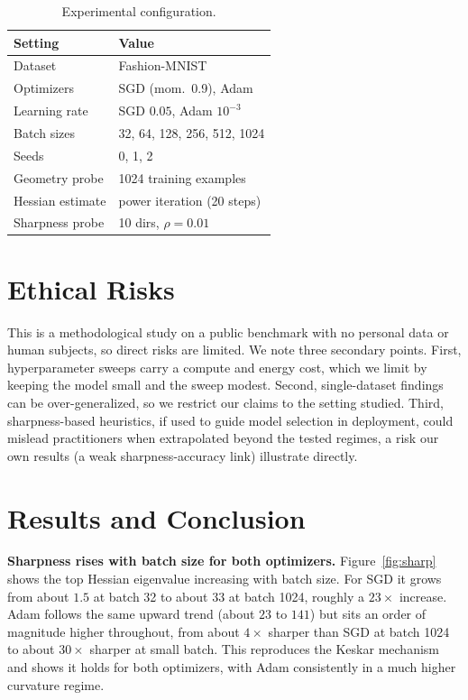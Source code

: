 \documentclass[a4paper,10pt,twoside]{article}
\begin{document}
\begin{table}[h]
\centering
\small
\begin{tabular}{@{}ll@{}}
\toprule
\textbf{Setting} & \textbf{Value} \\
\midrule
Dataset & Fashion-MNIST \\
Optimizers & SGD (mom.\ 0.9), Adam \\
Learning rate & SGD $0.05$, Adam $10^{-3}$ \\
Batch sizes & 32, 64, 128, 256, 512, 1024 \\
Seeds & 0, 1, 2 \\
Geometry probe & 1024 training examples \\
Hessian estimate & power iteration (20 steps) \\
Sharpness probe & 10 dirs, $\rho = 0.01$ \\
\bottomrule
\end{tabular}
\caption{Experimental configuration.}
\label{tab:config}
\end{table}

\section{Ethical Risks}
This is a methodological study on a public benchmark with no personal data or human subjects, so direct risks are limited. We note three secondary points. First, hyperparameter sweeps carry a compute and energy cost, which we limit by keeping the model small and the sweep modest. Second, single-dataset findings can be over-generalized, so we restrict our claims to the setting studied. Third, sharpness-based heuristics, if used to guide model selection in deployment, could mislead practitioners when extrapolated beyond the tested regimes, a risk our own results (a weak sharpness-accuracy link) illustrate directly.

\section{Results and Conclusion}
\textbf{Sharpness rises with batch size for both optimizers.} Figure~\ref{fig:sharp} shows the top Hessian eigenvalue increasing with batch size. For SGD it grows from about $1.5$ at batch 32 to about $33$ at batch 1024, roughly a $23\times$ increase. Adam follows the same upward trend (about $23$ to $141$) but sits an order of magnitude higher throughout, from about $4\times$ sharper than SGD at batch 1024 to about $30\times$ sharper at small batch. This reproduces the Keskar mechanism and shows it holds for both optimizers, with Adam consistently in a much higher curvature regime.
\end{document}
